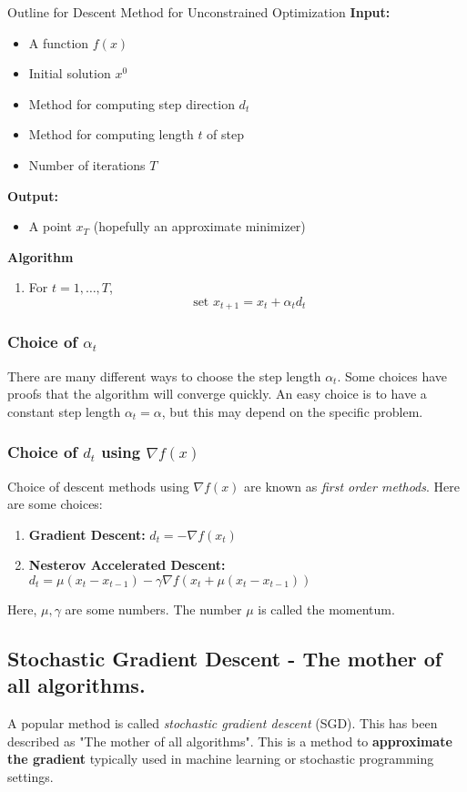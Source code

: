 \documentclass[../open-optimization/open-optimization.tex]{subfiles}
\begin{document}
\begin{general}{Outline for Descent Method for Unconstrained Optimization}{}
\textbf{Input:} 
\begin{itemize}
\item A function $f(x)$
\item Initial solution $x^0$
\item Method for computing step direction $d_t$
\item Method for computing length $t$ of step
\item Number of iterations $T$
\end{itemize}

\textbf{Output:}
\begin{itemize}
\item A point $x_{T}$ (hopefully an approximate minimizer)
\end{itemize}

\textbf{Algorithm}
\begin{enumerate}
\item For $t=1, \dots, T$,
$$
\text{ set } x_{t+1} = x_t + \alpha_t d_t 
$$
\end{enumerate}

\end{general}
\subsubsection{Choice of $\alpha_t$}
There are many different ways to choose the step length $\alpha_t$.  Some choices have proofs that the algorithm will converge quickly.  An easy choice is to have a constant step length $\alpha_t = \alpha$, but this may depend on the specific problem.

\subsubsection{Choice of $d_t$ using $\nabla f(x)$}
Choice of descent methods using $\nabla f(x)$ are known as \emph{first order methods}.
Here are some choices:
\begin{enumerate}
\item \textbf{Gradient Descent:}   $d_t = - \nabla f(x_t)$
\item \textbf{Nesterov Accelerated Descent:} $d_t = \mu (x_t - x_{t-1}) - \gamma \nabla f(x_t + \mu(x_t- x_{t-1}))$
\end{enumerate}
Here, $\mu, \gamma$ are some numbers.  The number $\mu$ is called the momentum.  

\subsection{Stochastic Gradient Descent - The mother of all algorithms.}
 A popular method is called \emph{stochastic gradient descent} (SGD).   This has been described as "The mother of all algorithms".  
 This is a method to \textbf{approximate the gradient} typically used in machine learning or stochastic programming settings.  
 
\end{document}
